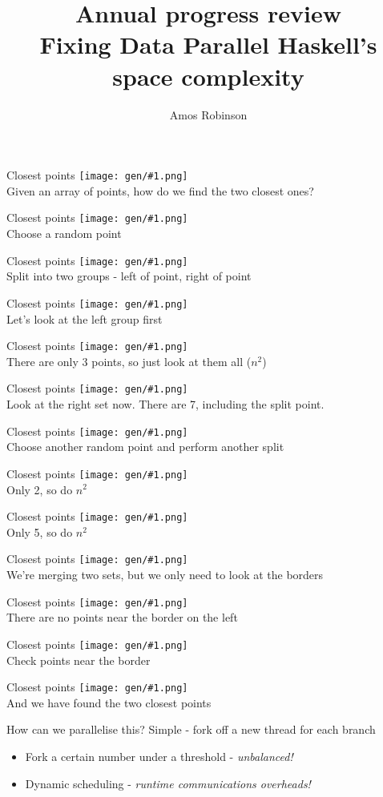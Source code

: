 \documentclass{beamer}
\newcommand{\fr}[1]{\begin{frame}[fragile]{#1}}
\newcommand{\im}[1]{\texttt{[image: gen/\#1.png]} \\ }
\begin{document}
\title{Annual progress review\\Fixing Data Parallel Haskell's space complexity}
\author{Amos Robinson}

\frame{\titlepage}

\fr{Closest points}
\im{01-points}
Given an array of points, how do we find the two closest ones?
\end{frame}

\fr{Closest points}
\im{02-pointsnsquared}
Choose a random point
\end{frame}

\fr{Closest points}
\im{03-split}
Split into two groups - left of point, right of point
\end{frame}

\fr{Closest points}
\im{04-lefts}
Let's look at the left group first
\end{frame}

\fr{Closest points}
\im{05-leftsolve}
There are only 3 points, so just look at them all ($n^2$)
\end{frame}

\fr{Closest points}
\im{06-right}
Look at the right set now. There are 7, including the split point.
\end{frame}

\fr{Closest points}
\im{07-rsplit}
Choose another random point and perform another split
\end{frame}

\fr{Closest points}
\im{08-rleft}
Only 2, so do $n^2$
\end{frame}

\fr{Closest points}
\im{09-rright}
Only 5, so do $n^2$
\end{frame}

\fr{Closest points}
\im{10-rjoin}
We're merging two sets, but we only need to look at the borders
\end{frame}

\fr{Closest points}
\im{11-rjoin2}
There are no points near the border on the left
\end{frame}

\fr{Closest points}
\im{12-join}
Check points near the border
\end{frame}

\fr{Closest points}
\im{13-join2}
And we have found the two closest points
\end{frame}


\fr{How can we parallelise this?}
Simple - fork off a new thread for each branch
\begin{itemize}
\item
Fork a certain number under a threshold - \emph{unbalanced!}
\item
Dynamic scheduling - \emph{runtime communications overheads!}
\end{itemize}
\end{frame}
\end{document}
